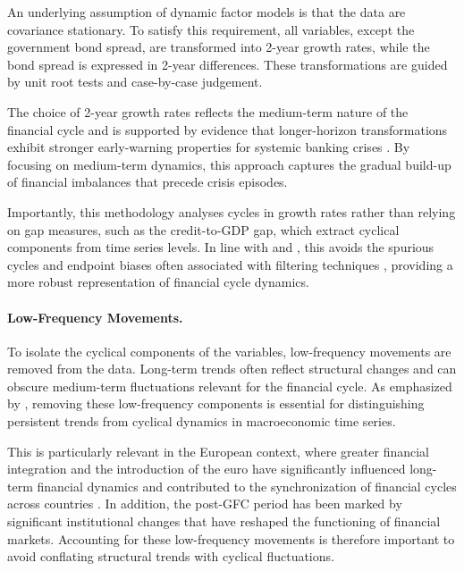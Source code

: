 An underlying assumption of dynamic factor models is that the data are covariance stationary. To satisfy this requirement, all variables, except the government bond spread, are transformed into 2-year growth rates, while the bond spread is expressed in 2-year differences. These transformations are guided by unit root tests and case-by-case judgement.

The choice of 2-year growth rates reflects the medium-term nature of the financial cycle and is supported by evidence that longer-horizon transformations exhibit stronger early-warning properties for systemic banking crises \citep{lang2019anticipating}. By focusing on medium-term dynamics, this approach captures the gradual build-up of financial imbalances that precede crisis episodes.

Importantly, this methodology analyses cycles in growth rates rather than relying on gap measures, such as the credit-to-GDP gap, which extract cyclical components from time series levels. In line with \citet{schuler2020financial} and \citet{lang2019anticipating}, this avoids the spurious cycles and endpoint biases often associated with filtering techniques \citep{schuler2018detrending}, providing a more robust representation of financial cycle dynamics.

\paragraph{Low-Frequency Movements.} 

To isolate the cyclical components of the variables, low-frequency movements are removed from the data. Long-term trends often reflect structural changes and can obscure medium-term fluctuations relevant for the financial cycle. As emphasized by \citet{stock2016dynamic}, removing these low-frequency components is essential for distinguishing persistent trends from cyclical dynamics in macroeconomic time series.

This is particularly relevant in the European context, where greater financial integration and the introduction of the euro have significantly influenced long-term financial dynamics and contributed to the synchronization of financial cycles across countries \citep{jorda2018global, aikman2015curbing}. In addition, the post-GFC period has been marked by significant institutional changes that have reshaped the functioning of financial markets. Accounting for these low-frequency movements is therefore important to avoid conflating structural trends with cyclical fluctuations.

